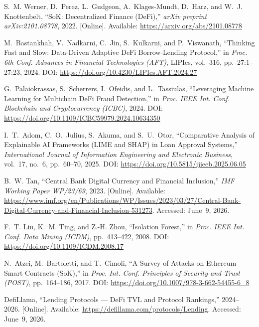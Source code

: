 \documentclass[12pt, a4paper]{report}
\begin{document}
{\small
\begin{enumerate}[label={[\arabic*]}]
\item S.~M. Werner, D.~Perez, L.~Gudgeon, A.~Klages-Mundt, D.~Harz, and W.~J. Knottenbelt, ``SoK: Decentralized Finance (DeFi),'' \textit{arXiv preprint arXiv:2101.08778}, 2022. [Online]. Available: \url{https://arxiv.org/abs/2101.08778}

\item M.~Bastankhah, V.~Nadkarni, C.~Jin, S.~Kulkarni, and P.~Viswanath, ``Thinking Fast and Slow: Data-Driven Adaptive DeFi Borrow-Lending Protocol,'' in \textit{Proc. 6th Conf. Advances in Financial Technologies (AFT)}, LIPIcs, vol.~316, pp.~27:1--27:23, 2024. DOI: \url{https://doi.org/10.4230/LIPIcs.AFT.2024.27}

\item G.~Palaiokrassas, S.~Scherrers, I.~Ofeidis, and L.~Tassiulas, ``Leveraging Machine Learning for Multichain DeFi Fraud Detection,'' in \textit{Proc. IEEE Int. Conf. Blockchain and Cryptocurrency (ICBC)}, 2024. DOI: \url{https://doi.org/10.1109/ICBC59979.2024.10634350}

\item I.~T.~Adom, C.~O.~Julius, S.~Akuma, and S.~U.~Otor, ``Comparative Analysis of Explainable AI Frameworks (LIME and SHAP) in Loan Approval Systems,'' \textit{International Journal of Information Engineering and Electronic Business}, vol.~17, no.~6, pp.~60--70, 2025. DOI: \url{https://doi.org/10.5815/ijieeb.2025.06.05}

\item B.~W. Tan, ``Central Bank Digital Currency and Financial Inclusion,'' \textit{IMF Working Paper WP/23/69}, 2023. [Online]. Available: \url{https://www.imf.org/en/Publications/WP/Issues/2023/03/27/Central-Bank-Digital-Currency-and-Financial-Inclusion-531273}. Accessed: June~9, 2026.

\item F.~T. Liu, K.~M. Ting, and Z.-H. Zhou, ``Isolation Forest,'' in \textit{Proc. IEEE Int. Conf. Data Mining (ICDM)}, pp.~413--422, 2008. DOI: \url{https://doi.org/10.1109/ICDM.2008.17}

\item N.~Atzei, M.~Bartoletti, and T.~Cimoli, ``A Survey of Attacks on Ethereum Smart Contracts (SoK),'' in \textit{Proc. Int. Conf. Principles of Security and Trust (POST)}, pp.~164--186, 2017. DOI: \url{https://doi.org/10.1007/978-3-662-54455-6_8}

\item DefiLlama, ``Lending Protocols --- DeFi TVL and Protocol Rankings,'' 2024--2026. [Online]. Available: \url{https://defillama.com/protocols/Lending}. Accessed: June~9, 2026.


\end{enumerate}}
\end{document}
